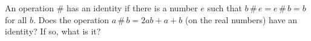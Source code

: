 An operation $\#$ has an identity if there is a number $e$ such that $b\,\#\,e=e\,\#\,b=b$ for all $b$. Does the operation $a\,\#\,b=2ab+a+b$ (on the real numbers) have an identity? If so, what is it?
